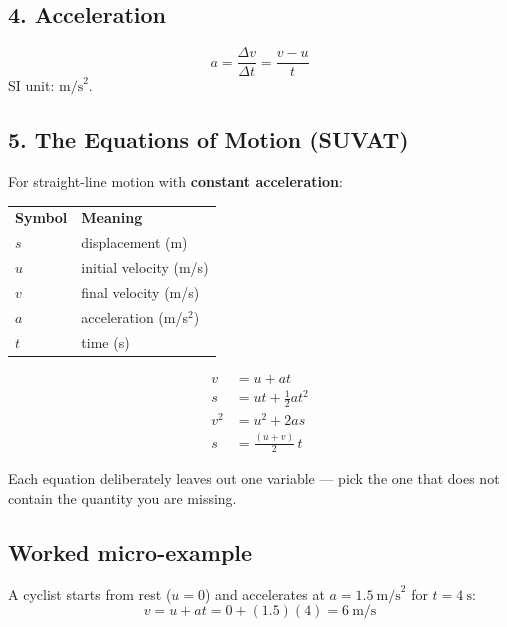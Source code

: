 \subsection*{4. Acceleration}
\begin{equation}
  a = \frac{\Delta v}{\Delta t} = \frac{v - u}{t}
\end{equation}
SI unit: $\text{m/s}^{2}$.

\subsection*{5. The Equations of Motion (SUVAT)}
For straight-line motion with \textbf{constant acceleration}:

\begin{center}
\begin{tabular}{ll}
\textbf{Symbol} & \textbf{Meaning} \\
$s$ & displacement (m) \\
$u$ & initial velocity (m/s) \\
$v$ & final velocity (m/s) \\
$a$ & acceleration (m/s$^2$) \\
$t$ & time (s) \\
\end{tabular}
\end{center}

\begin{align}
  v   &= u + at \\
  s   &= ut + \tfrac{1}{2}at^{2} \\
  v^2 &= u^{2} + 2as \\
  s   &= \frac{(u+v)}{2}\,t
\end{align}

Each equation deliberately leaves out one variable --- pick the one that
does not contain the quantity you are missing.

\subsection*{Worked micro-example}
A cyclist starts from rest ($u=0$) and accelerates at
$a = 1.5\ \text{m/s}^2$ for $t = 4\ \text{s}$:
\begin{equation}
  v = u + at = 0 + (1.5)(4) = 6\ \text{m/s}
\end{equation}
